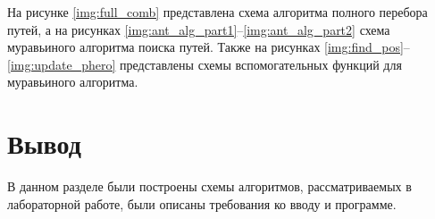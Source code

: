 На рисунке \ref{img:full_comb} представлена схема алгоритма полного перебора путей, а на рисунках \ref{img:ant_alg_part1}--\ref{img:ant_alg_part2} схема муравьиного алгоритма поиска путей. Также на рисунках \ref{img:find_pos}--\ref{img:update_phero} представлены схемы вспомогательных функций для муравьиного алгоритма.


\clearpage

\section*{Вывод}

В данном разделе были построены схемы алгоритмов, рассматриваемых в лабораторной работе, были описаны требования ко вводу и программе.